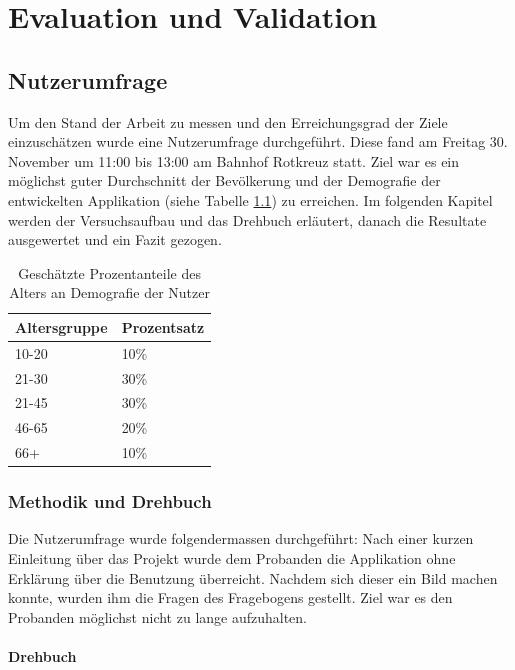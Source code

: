 \documentclass[a4paper]{scrreprt}
\begin{document}
\chapter{Evaluation und Validation}
\section{Nutzerumfrage}
Um den Stand der Arbeit zu messen und den Erreichungsgrad der Ziele einzuschätzen wurde eine Nutzerumfrage durchgeführt. Diese fand am Freitag 30. November um 11:00 bis 13:00 am Bahnhof Rotkreuz statt. Ziel war es ein möglichst guter Durchschnitt der Bevölkerung und der Demografie der entwickelten Applikation (siehe Tabelle \ref{tab:UserDemografie}) zu erreichen. Im folgenden Kapitel werden der Versuchsaufbau und das Drehbuch erläutert, danach die Resultate ausgewertet und ein Fazit gezogen.

\begin{table}[htb]
	\centering
	\begin{tabular}{|p{}|p{}|}
		\hline
		\textbf{Altersgruppe} & \textbf{Prozentsatz} \\
		\hline
		10-20 & 10\% \\
		\hline
		21-30 & 30\% \\
		\hline
		21-45 & 30\% \\
		\hline
		46-65 & 20\% \\
		\hline
		66+ & 10\% \\
		\hline
	\end{tabular}
	\label{tab:UserDemografie}
	\caption{Geschätzte Prozentanteile des Alters an Demografie der Nutzer}
\end{table}

\subsection{Methodik und Drehbuch}
Die Nutzerumfrage wurde folgendermassen durchgeführt: Nach einer kurzen Einleitung über das Projekt wurde dem Probanden die Applikation ohne Erklärung über die Benutzung überreicht. Nachdem sich dieser ein Bild machen konnte, wurden ihm die Fragen des Fragebogens gestellt. Ziel war es den Probanden möglichst nicht zu lange aufzuhalten.

\subsubsection{Drehbuch}
\end{document}
